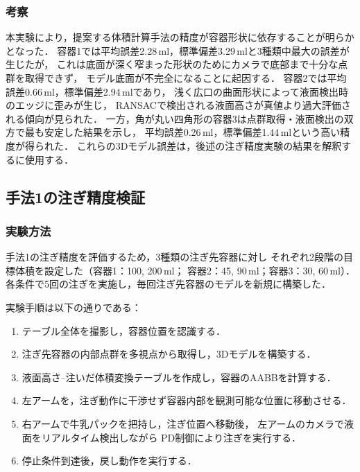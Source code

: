 \subsubsection{考察}
本実験により，提案する体積計算手法の精度が容器形状に依存することが明らかとなった．
容器1では平均誤差2.28\,ml，標準偏差3.29\,mlと3種類中最大の誤差が生じたが，
これは底面が深く窄まった形状のためにカメラで底部まで十分な点群を取得できず，
モデル底面が不完全になることに起因する．
容器2では平均誤差0.66\,ml，標準偏差2.94\,mlであり，
浅く広口の曲面形状によって液面検出時のエッジに歪みが生じ，
RANSACで検出される液面高さが真値より過大評価される傾向が見られた．
一方，角が丸い四角形の容器3は点群取得・液面検出の双方で最も安定した結果を示し，
平均誤差0.26\,ml，標準偏差1.44\,mlという高い精度が得られた．
これらの3Dモデル誤差は，後述の注ぎ精度実験の結果を解釈するに使用する．

\subsection{手法1の注ぎ精度検証}
\label{sec:pour_exp_method1}

\subsubsection{実験方法}

手法1の注ぎ精度を評価するため，3種類の注ぎ先容器に対し
それぞれ2段階の目標体積を設定した（容器1：100, 200\,ml；
容器2：45, 90\,ml；容器3：30, 60\,ml）．
各条件で5回の注ぎを実施し，毎回注ぎ先容器のモデルを新規に構築した．

実験手順は以下の通りである：
\begin{enumerate}
  \item テーブル全体を撮影し，容器位置を認識する．
  \item 注ぎ先容器の内部点群を多視点から取得し，3Dモデルを構築する．
  \item 液面高さ--注いだ体積変換テーブルを作成し，容器のAABBを計算する．
  \item 左アームを，注ぎ動作に干渉せず容器内部を観測可能な位置に移動させる．
  \item 右アームで牛乳パックを把持し，注ぎ位置へ移動後，
        左アームのカメラで液面をリアルタイム検出しながら
        PD制御により注ぎを実行する．
  \item 停止条件到達後，戻し動作を実行する．
\end{enumerate}

